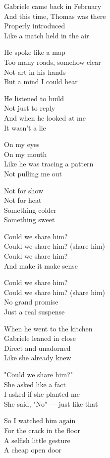 \begin{lyrics}
Gabriele came back in February\\
And this time, Thomas was there\\
Properly introduced\\
Like a match held in the air

He spoke like a map\\
Too many roads, somehow clear\\
Not art in his hands\\
But a mind I could hear

He listened to build\\
Not just to reply\\
And when he looked at me\\
It wasn't a lie

On my eyes\\
On my mouth\\
Like he was tracing a pattern\\
Not pulling me out

Not for show\\
Not for heat\\
Something colder\\
Something sweet

Could we share him?\\
Could we share him? (share him)\\
Could we share him?\\
And make it make sense

Could we share him?\\
Could we share him? (share him)\\
No grand promise\\
Just a real suspense

When he went to the kitchen\\
Gabriele leaned in close\\
Direct and unadorned\\
Like she already knew

"Could we share him?"\\
She asked like a fact\\
I asked if she planted me\\
She said, "No" — just like that

So I watched him again\\
For the crack in the floor\\
A selfish little gesture\\
A cheap open door


\end{lyrics}
